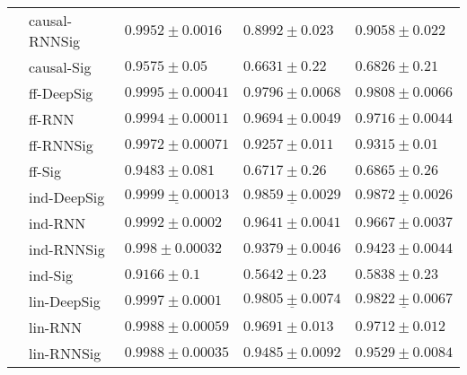 \begin{tabular}{lllll}
       & causal-RNNSig &                            $ 0.9952 \pm 0.0016 $ &                            $ 0.8992 \pm 0.023 $ &                            $ 0.9058 \pm 0.022 $ \\
       & causal-Sig &                              $ 0.9575 \pm 0.05 $ &                             $ 0.6631 \pm 0.22 $ &                             $ 0.6826 \pm 0.21 $ \\
       & ff-DeepSig &                           $ 0.9995 \pm 0.00041 $ &                           $ 0.9796 \pm 0.0068 $ &                           $ 0.9808 \pm 0.0066 $ \\
       & ff-RNN &                           $ 0.9994 \pm 0.00011 $ &                           $ 0.9694 \pm 0.0049 $ &                           $ 0.9716 \pm 0.0044 $ \\
       & ff-RNNSig &                           $ 0.9972 \pm 0.00071 $ &                            $ 0.9257 \pm 0.011 $ &                             $ 0.9315 \pm 0.01 $ \\
       & ff-Sig &                             $ 0.9483 \pm 0.081 $ &                             $ 0.6717 \pm 0.26 $ &                             $ 0.6865 \pm 0.26 $ \\
       & ind-DeepSig &  $  \mathbf{ \underline{ 0.9999 \pm 0.00013 }} $ &  $  \mathbf{ \underline{ 0.9859 \pm 0.0029 }} $ &  $  \mathbf{ \underline{ 0.9872 \pm 0.0026 }} $ \\
       & ind-RNN &                            $ 0.9992 \pm 0.0002 $ &                           $ 0.9641 \pm 0.0041 $ &                           $ 0.9667 \pm 0.0037 $ \\
       & ind-RNNSig &                            $ 0.998 \pm 0.00032 $ &                           $ 0.9379 \pm 0.0046 $ &                           $ 0.9423 \pm 0.0044 $ \\
       & ind-Sig &                               $ 0.9166 \pm 0.1 $ &                             $ 0.5642 \pm 0.23 $ &                             $ 0.5838 \pm 0.23 $ \\
       & lin-DeepSig &                            $ 0.9997 \pm 0.0001 $ &            $  \underline{ 0.9805 \pm 0.0074 } $ &            $  \underline{ 0.9822 \pm 0.0067 } $ \\
       & lin-RNN &                           $ 0.9988 \pm 0.00059 $ &                            $ 0.9691 \pm 0.013 $ &                            $ 0.9712 \pm 0.012 $ \\
       & lin-RNNSig &                           $ 0.9988 \pm 0.00035 $ &                           $ 0.9485 \pm 0.0092 $ &                           $ 0.9529 \pm 0.0084 $ \\

\end{tabular}
